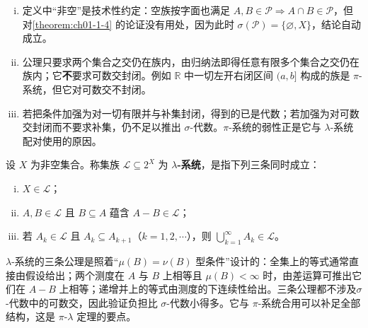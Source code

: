 \documentclass[../../main.tex]{subfiles}
\begin{document}
\begin{remark}\label{remark:ch01-def-1-7-系统条件}
\begin{enumerate}[(i)]
\item 定义中“非空”是技术性约定：空族按字面也满足 $A,B\in\mathcal{P}\Rightarrow A\cap B\in\mathcal{P}$，但对\cref{theorem:ch01-1-4} 的论证没有用处，因为此时 $\sigma(\mathcal{P})=\{\varnothing,X\}$，结论自动成立。%
\item 公理只要求两个集合之交仍在族内，由归纳法即得任意有限多个集合之交仍在族内；它\textbf{不}要求可数交封闭。例如 $\mathbb{R}$ 中一切左开右闭区间 $(a,b]$ 构成的族是 $\pi$-系统，但它对可数交不封闭。
\item 若把条件加强为对一切有限并与补集封闭，得到的已是代数；若加强为对可数交封闭而不要求补集，仍不足以推出 $\sigma$-代数。$\pi$-系统的弱性正是它与 $\lambda$-系统配对使用的原因。
\end{enumerate}
\end{remark}

\begin{definition}[$\lambda$-系统]\label{definition:ch01-1-8}
设 $X$ 为非空集合。称集族 $\mathcal{L}\subseteq2^{X}$ 为 \textbf{$\lambda$-系统}，是指下列三条同时成立：
\begin{enumerate}[(i)]
\item $X\in\mathcal{L}$；
\item $A,B\in\mathcal{L}$ 且 $B\subseteq A$ 蕴含 $A-B\in\mathcal{L}$；
\item 若 $A_{k}\in\mathcal{L}$ 且 $A_{k}\subseteq A_{k+1}$（$k=1,2,\cdots$），则 $\bigcup_{k=1}^{\infty}A_{k}\in\mathcal{L}$。
\end{enumerate}
\end{definition}

\begin{remark}\label{remark:ch01-def-1-8-差分动机}
$\lambda$-系统的三条公理是照着“$\mu(B)=\nu(B)$ 型条件”设计的：全集上的等式通常直接由假设给出；两个测度在 $A$ 与 $B$ 上相等且 $\mu(B)<\infty$ 时，由差运算可推出它们在 $A-B$ 上相等；递增并上的等式由测度的下连续性给出。三条公理都不涉及$\sigma$-代数中的可数交，因此验证负担比 $\sigma$-代数小得多。它与 $\pi$-系统合用可以补足全部结构，这是 $\pi$-$\lambda$ 定理的要点。
\end{remark}
\end{document}
